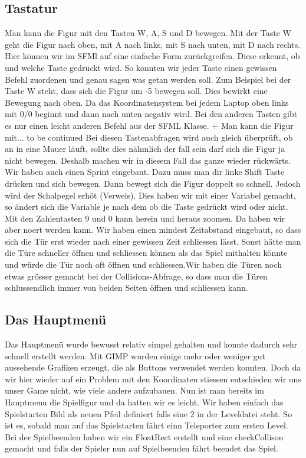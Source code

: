 \documentclass[11pt,a4paper]{scrbook}
\begin{document}
\subsection{Tastatur}
Man kann die Figur mit den Tasten W, A, S und D bewegen. Mit der Taste W geht die Figur nach oben, mit A nach links, mit S nach unten, mit D nach rechts. Hier können wir im SFMl auf eine einfache Form zurückgreifen. Diese erkennt, ob und welche Taste gedrückt wird. So konnten wir jeder Taste einen gewissen Befehl zuordenen und genau sagen was getan werden soll. Zum Beispiel bei der Taste W steht, dass sich die Figur um -5 bewegen soll. Dies bewirkt eine Bewegung nach oben. Da das Koordinatensystem bei jedem Laptop oben links mit 0/0 beginnt und dann nach unten negativ wird. Bei den anderen Tasten gibt es nur einen leicht anderen Befehl aus der SFML Klasse. 	+ Man kann die Figur mit... to be continued
Bei diesen Tastenabfragen wird auch gleich überprüft, ob an in eine Mauer läuft, sollte dies nähmlich der fall sein darf sich die Figur ja nicht bewegen. Deshalb machen wir in diesem Fall das ganze wieder rückwärts. Wir haben auch einen Sprint eingebaut. Dazu muss man dir linke Shift Taste drücken und sich bewegen. Dann bewegt sich die Figur doppelt so schnell. Jedoch wird der Schalpegel erhöt (Verweis). Dies haben wir mit einer Variabel gemacht, so ändert sich die Variable je nach dem ob die Taste gedrückt wird oder nicht. 	
Mit den Zahlentasten 9 und 0 kann herein und heraus zoomen. Da haben wir aber noert werden kann. Wir haben einen mindest Zeitabstand eingebaut, so dass sich die Tür erst wieder nach einer gewissen Zeit schliessen lässt. Sonst hätte man die Türe schneller öffnen und schliessen können als das Spiel mithalten könnte und würde die Tür noch oft öffnen und schliessen.Wir haben die Türen noch etwas grösser gemacht bei der Collisions-Abfrage, so dass man die Türen schlussendlich immer von beiden Seiten öffnen und schliessen kann. 	
 	
 	
\subsection{Das Hauptmenü} 	
Das Hauptmenü wurde bewusst relativ simpel gehalten und konnte dadurch sehr schnell erstellt werden. Mit GIMP wurden 	
einige mehr oder weniger gut aussehende Grafiken erzeugt, die als Buttons verwendet werden konnten. Doch da wir hier wieder auf ein Problem mit den Koordinaten stiessen entschieden wir uns unser Game nicht, wie viele andere aufzubauen. Nun ist man bereits im Hauptmenu die Spielfigur und da hatten wir es leicht. Wir haben einfach das Spielstarten Bild als neuen Pfeil definiert falls eine 2 in der Leveldatei steht. So ist es, sobald man auf das Spielstarten fährt einn Teleporter zum ersten Level. Bei der Spielbeenden haben wir ein FloatRect erstellt und eine checkCollison gemacht und falls der Spieler nun auf Spielbeenden fährt beendet das Spiel. 	
 	
\end{document}
